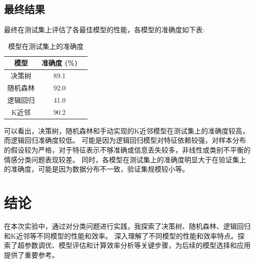 \documentclass[12pt,a4paper]{article}
\begin{document}
\subsection{最终结果}
最终在测试集上评估了各最佳模型的性能，各模型的准确度如下表:
\begin{table}[H]
    \centering
    \caption{模型在测试集上的准确度}
    \label{tab:accuracy}
    \begin{tabular}{ccc}
      \toprule
      模型 & 准确度 (\%) \\
      \midrule
      决策树 & 89.1 \\
      随机森林 & 92.0 \\
      逻辑回归 & 41.0 \\
      K近邻 & 90.2 \\
      \bottomrule
    \end{tabular}
  \end{table}
可以看出，决策树，随机森林和手动实现的K近邻模型在测试集上的准确度较高，而逻辑回归准确度较低。
可能是因为逻辑回归模型对特征依赖较强，对样本分布的假设较为严格，对于特征表示不够准确或信息丢失较多，非线性或类别不平衡的情感分类问题表现较差。
同时，各模型在测试集上的准确度明显大于在验证集上的准确度，可能是因为数据分布不一致，验证集规模较小等。
\section{结论}
在本次实验中，通过对分类问题进行实践，我探索了决策树、随机森林、逻辑回归和K近邻等不同模型的性能和效率。
深入理解了不同模型的性能和效率特点。探索了超参数调优、模型评估和计算效率分析等关键步骤，为后续的模型选择和应用提供了重要参考。
\end{document}
